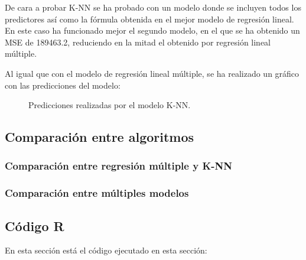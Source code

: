 De cara a probar K-NN se ha probado con un modelo donde se incluyen todos los predictores así como la fórmula obtenida en el mejor modelo de regresión lineal. En este caso ha funcionado mejor el segundo modelo, en el que se ha obtenido un MSE de 189463.2, reduciendo en la mitad el obtenido por regresión lineal múltiple.

Al igual que con el modelo de regresión lineal múltiple, se ha realizado un gráfico con las predicciones del modelo:

\begin{figure}[H]
	\centering
	
	\caption{Predicciones realizadas por el modelo K-NN.}
	\label{fig:predicciones_knn}
\end{figure}

\subsection{Comparación entre algoritmos}

\subsubsection{Comparación entre regresión múltiple y K-NN}

\subsubsection{Comparación entre múltiples modelos}


\subsection{Código R}

En esta sección está el código ejecutado en esta sección:

